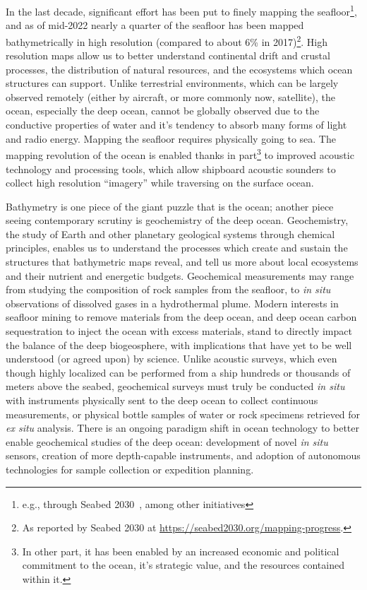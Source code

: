 In the last decade, significant effort has been put to finely mapping the seafloor\footnote{e.g., through Seabed 2030~\autocite{mayer2018nippon}, among other initiatives}, and as of mid-2022 nearly a quarter of the seafloor has been mapped bathymetrically in high resolution (compared to about 6\% in 2017)\footnote{As reported by Seabed 2030 at \url{https://seabed2030.org/mapping-progress}.}. 
High resolution maps allow us to better understand continental drift and crustal processes, the distribution of natural resources, and the ecosystems which ocean structures can support.
Unlike terrestrial environments, which can be largely observed remotely (either by aircraft, or more commonly now, satellite), the ocean, especially the deep ocean, cannot be globally observed due to the conductive properties of water and it's tendency to absorb many forms of light and radio energy.
Mapping the seafloor requires physically going to sea.
The mapping revolution of the ocean is enabled thanks in part\footnote{In other part, it has been enabled by an increased economic and political commitment to the ocean, it's strategic value, and the resources contained within it.} to improved acoustic technology and processing tools, which allow shipboard acoustic sounders to collect high resolution ``imagery'' while traversing on the surface ocean.

Bathymetry is one piece of the giant puzzle that is the ocean; another piece seeing contemporary scrutiny is geochemistry of the deep ocean.
Geochemistry, the study of Earth and other planetary geological systems through chemical principles, enables us to understand the processes which create and sustain the structures that bathymetric maps reveal, and tell us more about local ecosystems and their nutrient and energetic budgets. 
Geochemical measurements may range from studying the composition of rock samples from the seafloor, to \emph{in situ} observations of dissolved gases in a hydrothermal plume.
Modern interests in seafloor mining to remove materials from the deep ocean\autocite{thompson2018seabed}, and deep ocean carbon sequestration to inject the ocean with excess materials\autocite{teng2018long}, stand to directly impact the balance of the deep biogeosphere, with implications that have yet to be well understood (or agreed upon) by science\autocite{smith2020deep,seibel2001potential,fleeger2010response,sharma2015environmental,childs2020extraction,van2011tighten}.
Unlike acoustic surveys, which even though highly localized can be performed from a ship hundreds or thousands of meters above the seabed, geochemical surveys must truly be conducted \emph{in situ} with instruments physically sent to the deep ocean to collect continuous measurements, or physical bottle samples of water or rock specimens retrieved for \emph{ex situ} analysis.
There is an ongoing paradigm shift in ocean technology to better enable geochemical studies of the deep ocean: development of novel \emph{in situ} sensors, creation of more depth-capable instruments, and adoption of autonomous technologies for sample collection or expedition planning. 

